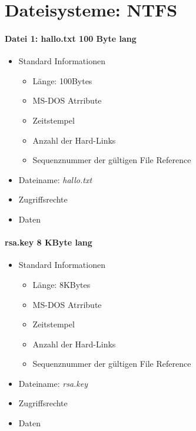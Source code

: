 \documentclass[a4paper]{article}
\begin{document}
\section{Dateisysteme: NTFS}
\paragraph{Datei 1: hallo.txt 100 Byte lang}
\begin{itemize}
    \item Standard Informationen
        \begin{itemize}
            \item Länge: 100Bytes
            \item MS-DOS Atrribute
            \item Zeitstempel
            \item Anzahl der Hard-Links
            \item Sequenznummer der gültigen File Reference
        \end{itemize}
    \item Dateiname: \textit{hallo.txt}
    \item Zugriffsrechte
    \item Daten
\end{itemize}

\paragraph{rsa.key 8 KByte lang}
\begin{itemize}
    \item Standard Informationen
        \begin{itemize}
            \item Länge: 8KBytes
            \item MS-DOS Atrribute
            \item Zeitstempel
            \item Anzahl der Hard-Links
            \item Sequenznummer der gültigen File Reference
        \end{itemize}
    \item Dateiname: \textit{rsa.key}
    \item Zugriffsrechte
    \item Daten
\end{itemize}
\end{document}
